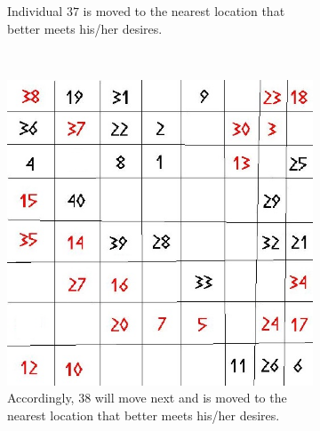 \begin{figure}[H]
\begin{subfigure}{0.3\textwidth}
        \caption{Individual $37$ is moved to the nearest location that better meets his/her desires. }
        \label{fig:movement2}
    \end{subfigure}
    ~ %
    \begin{subfigure}{0.3\textwidth}
        \includegraphics[width=\textwidth]{segregation_tegenvb_2.jpg}
        \caption{Accordingly, $38$ will move next and is moved to the nearest location that better meets his/her desires.}
        \label{fig:movement3}
    \end{subfigure}\hspace{1cm}
    \begin{subfigure}{0.3\textwidth}

\end{subfigure}
\end{figure}

